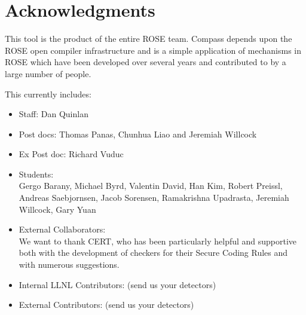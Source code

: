 \section*{Acknowledgments}

   This tool is the product of the entire ROSE team. Compass
depends upon the ROSE open compiler infrastructure and is a
simple application of mechanisms in ROSE which have been 
developed over several years and contributed to by a large 
number of people.

This currently includes:

\begin{itemize}
   \item Staff: Dan Quinlan
   \item Post docs: Thomas Panas, Chunhua Liao and Jeremiah Willcock
   \item Ex Post doc: Richard Vuduc 
   \item Students: \\
         Gergo Barany, Michael Byrd, Valentin David, Han Kim, Robert Preissl,
         Andreas Saebjornsen, Jacob Sorensen, Ramakrishna Upadrasta, 
         Jeremiah Willcock, Gary Yuan
   \item External Collaborators: \\ 
         We want to thank CERT, who has been particularly helpful and supportive both
         with the development of checkers for their Secure Coding Rules and with 
         numerous suggestions.
   \item Internal LLNL Contributors: (send us your detectors)
   \item External Contributors: (send us your detectors)
\end{itemize}

